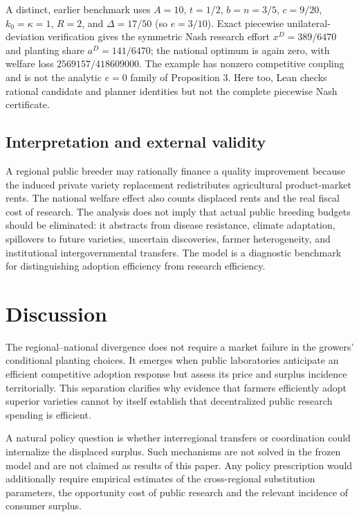 \documentclass[11pt]{article}
\begin{document}
A distinct, earlier benchmark uses $A=10$, $t=1/2$, $b=n=3/5$, $c=9/20$, $k_0=\kappa=1$, $R=2$, and $\Delta=17/50$ (so $e=3/10$). Exact piecewise unilateral-deviation verification gives the symmetric Nash research effort $x^D=389/6470$ and planting share $a^D=141/6470$; the national optimum is again zero, with welfare loss $2569157/418609000$. The example has nonzero competitive coupling and is not the analytic $e=0$ family of Proposition 3. Here too, Lean checks rational candidate and planner identities but not the complete piecewise Nash certificate.

\subsection{Interpretation and external validity}
A regional public breeder may rationally finance a quality improvement because the induced private variety replacement redistributes agricultural product-market rents. The national welfare effect also counts displaced rents and the real fiscal cost of research. The analysis does not imply that actual public breeding budgets should be eliminated: it abstracts from disease resistance, climate adaptation, spillovers to future varieties, uncertain discoveries, farmer heterogeneity, and institutional intergovernmental transfers. The model is a diagnostic benchmark for distinguishing adoption efficiency from research efficiency.

\section{Discussion}
The regional--national divergence does not require a market failure in the growers' conditional planting choices. It emerges when public laboratories anticipate an efficient competitive adoption response but assess its price and surplus incidence territorially. This separation clarifies why evidence that farmers efficiently adopt superior varieties cannot by itself establish that decentralized public research spending is efficient.

A natural policy question is whether interregional transfers or coordination could internalize the displaced surplus. Such mechanisms are not solved in the frozen model and are not claimed as results of this paper. Any policy prescription would additionally require empirical estimates of the cross-regional substitution parameters, the opportunity cost of public research and the relevant incidence of consumer surplus.
\end{document}
